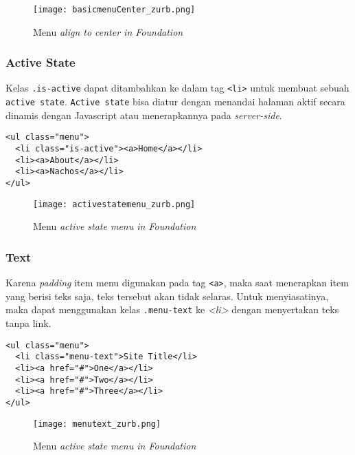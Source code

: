\begin{figure} [H]
	\centering  
	\texttt{[image: basicmenuCenter\_zurb.png]}  
	\caption{Menu \textit{align to center in Foundation}}
	\label{fig:gridbasic_zurb} 
\end{figure}

\subsubsection{Active State}
\label{sssec:navigation_3}
Kelas \texttt{.is-active} dapat ditambahkan ke dalam tag \texttt{<li>} untuk membuat sebuah \texttt{active state}. \texttt{Active state} bisa diatur dengan  menandai halaman aktif secara dinamis dengan Javascript atau menerapkannya pada \textit{server-side}.\cite{zurbfoundation:17}

\begin{lstlisting}[frame=single] 
<ul class="menu">
  <li class="is-active"><a>Home</a></li>
  <li><a>About</a></li>
  <li><a>Nachos</a></li>
</ul>
\end{lstlisting}

\begin{figure} [H]
	\centering  
	\texttt{[image: activestatemenu\_zurb.png]}  
	\caption{Menu \textit{active state menu in Foundation}}
	\label{fig:activestate_zurb} 
\end{figure}


\subsubsection{Text}
\label{sssec:navigation_4}
Karena \textit{padding} item menu digunakan pada tag \texttt{<a>}, maka saat menerapkan item yang berisi teks saja, teks tersebut akan tidak selaras. Untuk menyiasatinya, maka dapat menggunakan kelas \texttt{.menu-text} ke \textit{<li>} dengan menyertakan teks tanpa link.\cite{zurbfoundation:17}

\begin{lstlisting}[frame=single]
 <ul class="menu">
  <li class="menu-text">Site Title</li>
  <li><a href="#">One</a></li>
  <li><a href="#">Two</a></li>
  <li><a href="#">Three</a></li>
</ul>
\end{lstlisting}

\begin{figure} [H]
	\centering  
	\texttt{[image: menutext\_zurb.png]}  
	\caption{Menu \textit{active state menu in Foundation}}
	\label{fig:activestate_zurb} 
\end{figure}

